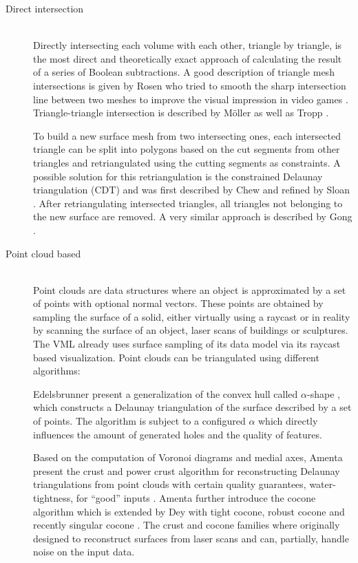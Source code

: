 \begin{description}
	\item[Direct intersection] \hfill \\
	Directly intersecting each volume with each other, triangle by triangle, is the most direct and theoretically exact approach of calculating the result of a series of Boolean subtractions.
	A good description of triangle mesh intersections is given by Rosen who tried to smooth the sharp intersection line between two meshes to improve the visual impression in video games \cite{mesh_intersection}.
	Triangle-triangle intersection is described by Möller \cite{tri_tri_intersection_moller} as well as Tropp \etal \cite{tri_tri_intersection_2}.

	To build a new surface mesh from two intersecting ones, each intersected triangle can be split into polygons based on the cut segments from other triangles and retriangulated using the cutting segments as constraints.
	A possible solution for this retriangulation is the constrained Delaunay triangulation (CDT) and was first described by Chew \cite{cdt} and refined by Sloan \cite{cdt_fast}.
	After retriangulating intersected triangles, all triangles not belonging to the new surface are removed.
	A very similar approach is described by Gong \cite{cutter_workpiece_engagement}.


	\item[Point cloud based] \hfill \\
	Point clouds are data structures where an object is approximated by a set of points with optional normal vectors.
	These points are obtained \eg by sampling the surface of a solid, either virtually using a raycast or in reality by scanning the surface of an object, \eg laser scans of buildings or sculptures.
	The VML already uses surface sampling of its data model via its raycast based visualization.
	Point clouds can be triangulated using different algorithms:

	Edelsbrunner \etal present a generalization of the convex hull called $\alpha$-shape \cite{alpha_shape}, which constructs a Delaunay triangulation of the surface described by a set of points.
	The algorithm is subject to a configured $\alpha$ which directly influences the amount of generated holes and the quality of features.

	Based on the computation of Voronoi diagrams and medial axes, Amenta \etal present the crust and power crust algorithm for reconstructing Delaunay triangulations from point clouds with certain quality guarantees, \eg water-tightness, for \enquote{good} inputs \cite{crust, power_crust}.
	Amenta \etal further introduce the cocone algorithm \cite{cocone} which is extended by Dey \etal with tight cocone, robust cocone and recently singular cocone \cite{tight_cocone, robust_cocone, singular_cocone}.
	The crust and cocone families where originally designed to reconstruct surfaces from laser scans and can, partially, handle noise on the input data.


\end{description}
